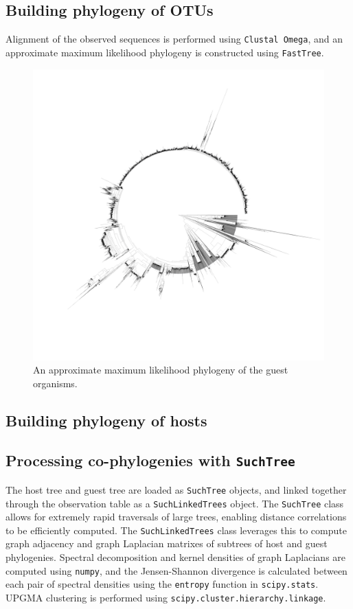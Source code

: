 \subsection{Building phylogeny of OTUs}

Alignment of the observed sequences is performed using {\tt Clustal Omega}, and an approximate maximum likelihood phylogeny is constructed using {\tt FastTree}.

\begin{figure}
    \includegraphics[width=\textwidth]{FishPoo/figures/fishpoo_tree.png}
    \caption{An approximate maximum likelihood phylogeny of the guest organisms.}
    \label{FP_guest_tree}
\end{figure}

\subsection{Building phylogeny of hosts}

\subsection{Processing co-phylogenies with {\tt SuchTree}}

The host tree and guest tree are loaded as {\tt SuchTree} objects, and linked together through the observation table as a {\tt SuchLinkedTrees} object. The {\tt SuchTree} class allows for extremely rapid traversals of large trees, enabling distance correlations to be efficiently computed. The {\tt SuchLinkedTrees} class leverages this to compute graph adjacency and graph Laplacian matrixes of subtrees of host and guest phylogenies. Spectral decomposition and kernel densities of graph Laplacians are computed using {\tt numpy}, and the Jensen-Shannon divergence is calculated between each pair of spectral densities using the {\tt entropy} function in {\tt scipy.stats}. UPGMA clustering is performed using {\tt scipy.cluster.hierarchy.linkage}.


